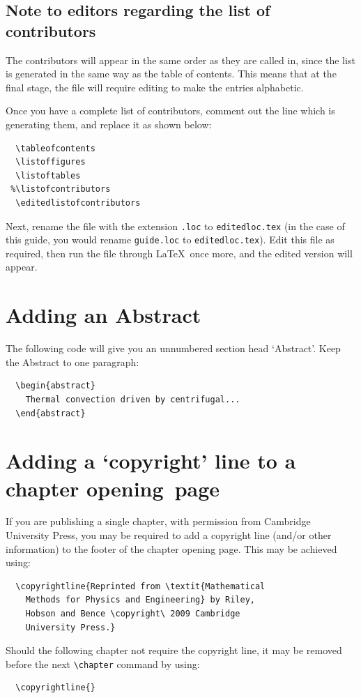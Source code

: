 \subsection{Note to editors regarding the list of contributors}

The contributors will appear in the same order as they are called in, since the list is generated in the same way as the table of contents. This means that at the final stage, the file will require editing to make the entries alphabetic.

Once you have a complete list of contributors, comment out the line which is generating them, and replace it as shown below:
\begin{verbatim}
  \tableofcontents
  \listoffigures
  \listoftables
 %\listofcontributors
  \editedlistofcontributors
\end{verbatim}
Next, rename the file with the extension \verb".loc" to \verb"editedloc.tex" (in the case of this guide, you would rename {\verbatimsize\texttt{\cambridge guide.loc}} to \verb"editedloc.tex"). Edit this file as required, then run the file through \LaTeX\ once more, and the edited version will appear.

\section{Adding an Abstract}
The following code will give you an unnumbered section head `Abstract'. Keep the Abstract to one paragraph:
\begin{verbatim}
  \begin{abstract}
    Thermal convection driven by centrifugal...
  \end{abstract}
\end{verbatim}

\section{Adding a `copyright' line to a chapter opening~page}
If you are publishing a single chapter, with permission from Cambridge University Press, you may be required to add a copyright line (and/or other information) to the footer of the chapter opening page. This may be achieved using:
\begin{verbatim}
  \copyrightline{Reprinted from \textit{Mathematical
    Methods for Physics and Engineering} by Riley,
    Hobson and Bence \copyright\ 2009 Cambridge
    University Press.}
\end{verbatim}
Should the following chapter not require the copyright line, it may be removed before the next \verb"\chapter" command by using:
\begin{verbatim}
  \copyrightline{}
\end{verbatim}


